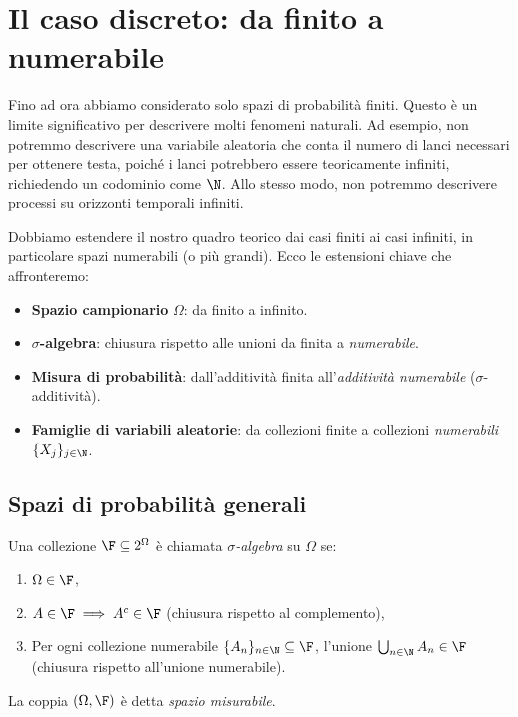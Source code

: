 \chapter{Il caso discreto: da finito a numerabile}

Fino ad ora abbiamo considerato solo spazi di probabilità finiti. Questo è un limite significativo per descrivere molti fenomeni naturali. Ad esempio, non potremmo descrivere una variabile aleatoria che conta il numero di lanci necessari per ottenere testa, poiché i lanci potrebbero essere teoricamente infiniti, richiedendo un codominio come $\N$. Allo stesso modo, non potremmo descrivere processi su orizzonti temporali infiniti. 

Dobbiamo estendere il nostro quadro teorico dai casi finiti ai casi infiniti, in particolare spazi numerabili (o più grandi). Ecco le estensioni chiave che affronteremo:
\begin{itemize}
    \item \textbf{Spazio campionario} $\Omega$: da finito a infinito.
    \item \textbf{$\sigma$-algebra}: chiusura rispetto alle unioni da finita a \emph{numerabile}.
    \item \textbf{Misura di probabilità}: dall'additività finita all'\emph{additività numerabile} ($\sigma$-additività).
    \item \textbf{Famiglie di variabili aleatorie}: da collezioni finite a collezioni \emph{numerabili} $\{X_j\}_{j \in \N}$.
\end{itemize}

\section{Spazi di probabilità generali}

\begin{definition}
Una collezione $\F \subseteq 2^\Omega$ è chiamata \emph{$\sigma$-algebra} su $\Omega$ se:
\begin{enumerate}
    \item $\Omega \in \F$,
    \item $A \in \F \implies A^c \in \F$ (chiusura rispetto al complemento),
    \item Per ogni collezione numerabile $\{A_n\}_{n \in \N} \subseteq \F$, l'unione $\bigcup_{n \in \N} A_n \in \F$ (chiusura rispetto all'unione numerabile).
\end{enumerate}
La coppia $(\Omega, \F)$ è detta \emph{spazio misurabile}.
\end{definition}

